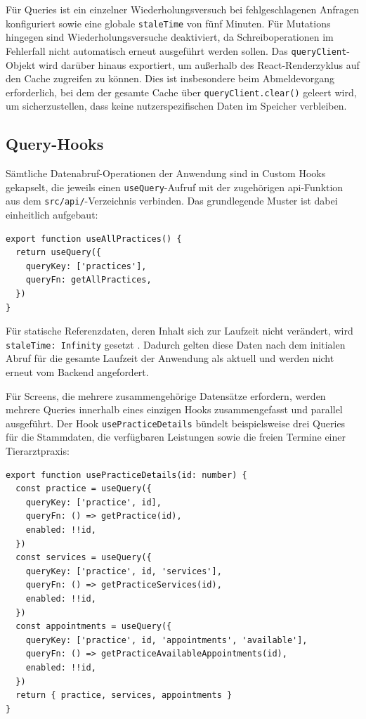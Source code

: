 Für Queries ist ein einzelner Wiederholungsversuch bei fehlgeschlagenen Anfragen konfiguriert
sowie eine globale \texttt{staleTime} von fünf Minuten. Für Mutations hingegen sind Wiederholungsversuche deaktiviert, da Schreiboperationen im Fehlerfall nicht automatisch erneut ausgeführt werden sollen. Das \texttt{queryClient}-Objekt wird darüber hinaus exportiert, um außerhalb des
React-Renderzyklus auf den Cache zugreifen zu können. Dies ist insbesondere beim Abmeldevorgang
erforderlich, bei dem der gesamte Cache über \texttt{queryClient.clear()} geleert wird,
um sicherzustellen, dass keine nutzerspezifischen Daten im Speicher verbleiben.

\subsection{Query-Hooks}

Sämtliche Datenabruf-Operationen der Anwendung sind in Custom Hooks gekapselt, die jeweils einen \texttt{useQuery}-Aufruf mit der zugehörigen \gls{api}-Funktion aus dem \texttt{src/api/}-Verzeichnis verbinden. Das grundlegende Muster ist dabei einheitlich
aufgebaut:

\begin{listing}[H]
\begin{verbatim}
export function useAllPractices() {
  return useQuery({
    queryKey: ['practices'],
    queryFn: getAllPractices,
  })
}
\end{verbatim}
\caption{Einfacher Query-Hook am Beispiel useAllPractices}
\label{lst:use-all-practices}
\end{listing}

Für statische Referenzdaten, deren Inhalt sich zur Laufzeit nicht verändert, wird \texttt{staleTime: Infinity} gesetzt \cite{tanstack-query-docs}. Dadurch gelten diese Daten nach dem initialen Abruf für die gesamte Laufzeit der Anwendung als aktuell und werden nicht erneut vom Backend angefordert.

Für Screens, die mehrere zusammengehörige Datensätze erfordern, werden mehrere Queries innerhalb eines einzigen Hooks zusammengefasst und parallel ausgeführt. Der Hook \texttt{usePracticeDetails} bündelt beispielsweise drei Queries für die Stammdaten, die verfügbaren Leistungen sowie die freien Termine einer Tierarztpraxis:

\begin{listing}[H]
\begin{verbatim}
export function usePracticeDetails(id: number) {
  const practice = useQuery({
    queryKey: ['practice', id],
    queryFn: () => getPractice(id),
    enabled: !!id,
  })
  const services = useQuery({
    queryKey: ['practice', id, 'services'],
    queryFn: () => getPracticeServices(id),
    enabled: !!id,
  })
  const appointments = useQuery({
    queryKey: ['practice', id, 'appointments', 'available'],
    queryFn: () => getPracticeAvailableAppointments(id),
    enabled: !!id,
  })
  return { practice, services, appointments }
}
\end{verbatim}
\caption{Parallele Queries in usePracticeDetails}
\label{lst:use-practice-details}
\end{listing}

